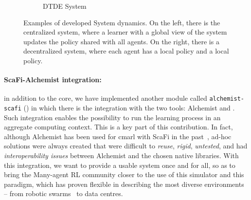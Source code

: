 \begin{figure}[t]
\begin{subfigure}[b]{0.49\textwidth}
        \caption{DTDE System}
        \label{fig:dtde}
    \end{subfigure}
\caption{Examples of developed System dynamics. 
On the left, there is the centralized system, 
where a learner with a global view of the system 
updates the policy shared with all agents. 
%
On the right, there is a decentralized system, 
where each agent has a local policy and a local policy.}
\end{figure}

\paragraph{ScaFi-Alchemist integration:} in addition to the core, we have implemented another module called \texttt{alchemist-scafi} () 
 in which there is the integration with the two tools: 
 Alchemist \cite{DBLP:journals/jos/PianiniMV13} and \scafi{} \cite{Casadei2022}.
%
Such integration enables the possibility to run the learning process 
 in an aggregate computing context.
This is a key part of this contribution. 
 In fact, although Alchemist has been used for \ac{cmarl} with ScaFi in the past~\cite{Aguzzi2022,DBLP:conf/acsos/AguzziCV22}, 
 ad-hoc solutions were always created that were difficult to \emph{reuse}, 
 \emph{rigid}, \emph{untested}, and had \emph{interoperability issues} between Alchemist 
 and the chosen native libraries.
With this integration, 
 we want to provide a usable system once and for all, 
 so as to bring the Many-agent RL community closer 
 to the use of this simulator and this paradigm, 
 which has proven flexible in describing the most diverse environments -- 
 from robotic swarms~\cite{Casadei2021} to data centres.

